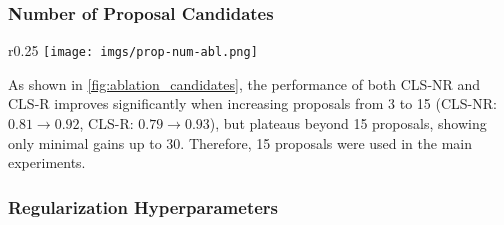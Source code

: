 \subsubsection{Number of Proposal Candidates}
\label{sec:number_of_proposal_candidates}

\begin{wrapfigure}{r}{0.25\textwidth}
    \vspace{-0.5cm}
    \centering
    \texttt{[image: imgs/prop-num-abl.png]}
    \caption{Proposal Number Ablation}
    \label{fig:ablation_candidates}
\end{wrapfigure}

As shown in \ref{fig:ablation_candidates}, the performance of both CLS-NR and CLS-R improves significantly when increasing proposals from 3 to 15 (CLS-NR: $0.81 \rightarrow 0.92$, CLS-R: $0.79 \rightarrow 0.93$), but plateaus beyond 15 proposals, showing only minimal gains up to 30. Therefore, 15 proposals were used in the main experiments.

\subsubsection{Regularization Hyperparameters}
\label{sec:regularization_hyperparameters}

